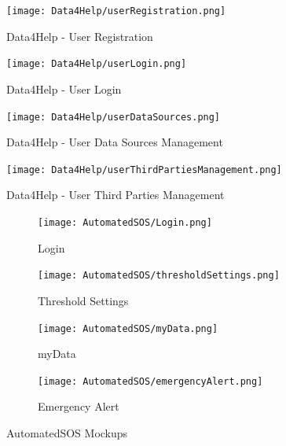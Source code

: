 \graphicspath{ {../Mockups/} }



\begin{figure}
  \texttt{[image: Data4Help/userRegistration.png]}
  \caption{Data4Help - User Registration}
  \label{Data4Help - User Registration}
\end{figure}

\begin{figure}
  \texttt{[image: Data4Help/userLogin.png]}
  \caption{Data4Help - User Login}
  \label{Data4Help - User Login}
\end{figure}

\begin{figure}
  \texttt{[image: Data4Help/userDataSources.png]}
  \caption{Data4Help - User Data Sources Management}
  \label{Data4Help - User Data Sources Management}
\end{figure}

\begin{figure}
  \texttt{[image: Data4Help/userThirdPartiesManagement.png]}
  \caption{Data4Help - User Third Parties Management}
  \label{Data4Help - User Third Parties Management}
\end{figure}



\begin{figure}[!ht]
  \centering
  \begin{subfigure}[b]{0.4\linewidth}
    \texttt{[image: AutomatedSOS/Login.png]}
    \caption{Login}
  \end{subfigure}\hfill
  \begin{subfigure}[b]{0.4\linewidth}
    \texttt{[image: AutomatedSOS/thresholdSettings.png]}
    \caption{Threshold Settings}
  \end{subfigure}
  \par\bigskip
  \begin{subfigure}[b]{0.4\linewidth}
    \texttt{[image: AutomatedSOS/myData.png]}
    \caption{myData}
  \end{subfigure}\hfill
  \begin{subfigure}[b]{0.4\linewidth}
    \texttt{[image: AutomatedSOS/emergencyAlert.png]}
    \caption{Emergency Alert}
  \end{subfigure}
  \caption{AutomatedSOS Mockups}
\end{figure}


